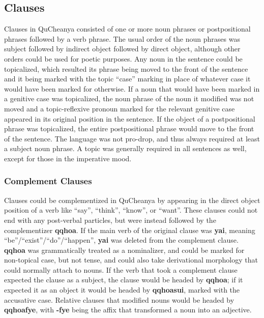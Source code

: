 \documentclass{article}
\begin{document}
\subsection{Clauses}

Clauses in QuCheanya consisted of one or more noun phrases or postpositional phrases followed by a verb phrase.  The usual order of the noun phrases was subject followed by indirect object followed by direct object, although other orders could be used for poetic purposes.  Any noun in the sentence could be topicalized, which resulted its phrase being moved to the front of the sentence and it being marked with the topic ``case'' marking in place of whatever case it would have been marked for otherwise.  If a noun that would have been marked in a genitive case was topicalized, the noun phrase of the noun it modified was not moved and a topic-reflexive pronoun marked for the relevant genitive case appeared in its original position in the sentence.  If the object of a postpositional phrase was topicalized, the entire postpositional phrase would move to the front of the sentence.  The language was not pro-drop, and thus always required at least a subject noun phrase.  A topic was generally required in all sentences as well, except for those in the imperative mood.

\subsubsection{Complement Clauses}

Clauses could be complementized in QuCheanya by appearing in the direct object position of a verb like ``say'', ``think'', ``know'', or ``want''.  These clauses could not end with any post-verbal particles, but were instead followed by the complementizer \textbf{qqhoa}.  If the main verb of the original clause was \textbf{yai}, meaning ``be''/``exist''/``do''/``happen'', \textbf{yai} was deleted from the complement clause. \textbf{qqhoa} was grammatically treated as a nominalizer, and could be marked for non-topical case, but not tense, and could also take derivational morphology that could normally attach to nouns.  If the verb that took a complement clause expected the clause as a subject, the clause would be headed by \textbf{qqhoa}; if it expected it as an object it would be headed by \textbf{qqhoasui}, marked with the accusative case.  Relative clauses that modified nouns would be headed by \textbf{qqhoafye}, with \textbf{-fye} being the affix that transformed a noun into an adjective.
\end{document}
